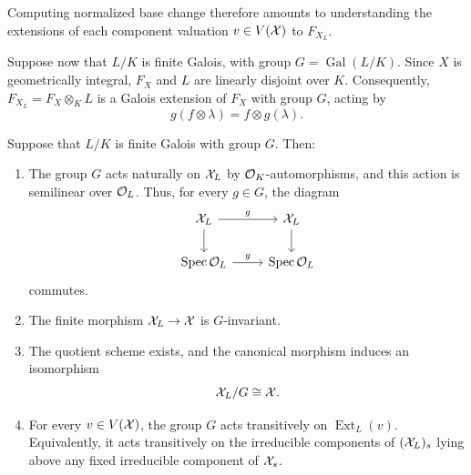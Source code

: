 Computing normalized base change therefore amounts to understanding the extensions of each component valuation $v\in V(\mathcal X)$ to $F_{X_L}$.

Suppose now that $L/K$ is finite Galois, with group $G=\operatorname{Gal}(L/K)$.
Since $X$ is geometrically integral, $F_X$ and $L$ are linearly disjoint over $K$.
Consequently, $F_{X_L}=F_X\otimes_K L$ is a Galois extension of $F_X$ with group $G$, acting by %
\[
    g(f\otimes\lambda)=f\otimes g(\lambda).
\]

\begin{corollary}\label{cor:galois-action-normalized-base-change}
    Suppose that $L/K$ is finite Galois with group $G$.
    Then:
    \begin{enumerate}[label=\textup{(\roman*)}]
        \item The group $G$ acts naturally on $\mathcal X_L$ by $\mathcal O_K$-automorphisms, and this action is semilinear over $\mathcal O_L$.
        Thus, for every $g\in G$, the diagram
        \[
            \begin{tikzcd}
                \X_L \arrow[r, "g"] \arrow[d] & \X_L \arrow[d] \\
                \Spec\OL \arrow[r, "g"] & \Spec\OL
            \end{tikzcd}
        \]
        commutes.
        \item The finite morphism $\mathcal X_L\to\mathcal X$ is $G$-invariant.
        \item The quotient scheme exists, and the canonical morphism induces an isomorphism
        \[
            \mathcal X_L/G\cong\mathcal X.
        \]
        \item For every $v\in V(\mathcal X)$, the group $G$ acts transitively on $\operatorname{Ext}_L(v)$.
        Equivalently, it acts transitively on the irreducible components of $(\mathcal X_L)_s$ lying above any fixed irreducible component of $\mathcal X_s$.
    \end{enumerate}
\end{corollary}

